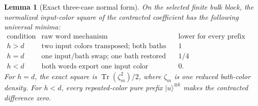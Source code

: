 \documentclass[11pt]{article}
\newtheorem{lemma}[theorem]{Lemma}
\newcommand{\Tr}{\operatorname{Tr}}
\newcommand{\ket}[1]{\lvert #1\rangle}
\begin{document}
\begin{lemma}[Exact three-case normal form]\label{lem:trichotomy}
On the selected finite bulk block, the normalized input-color square of
the contracted coefficient has the following universal minima:
\[
 \begin{array}{c|c|c}
 \text{condition}&\text{raw word mechanism}&
       \text{lower for every prefix density}\\\hline
 h>d&\text{two input colors transposed; both baths restored}&1\\
 h=d&\text{one input/bath swap; one bath restored}&1/4\\
 h<d&\text{both words export one input color}&0.
 \end{array}
\]
For $h=d$, the exact square is $\Tr(\zeta_m^2)/2$, where $\zeta_m$
is one reduced bath-color density. For $h<d$, every repeated-color
pure prefix $\ket u^{\otimes k}$ makes the contracted difference zero.
\end{lemma}
\end{document}
